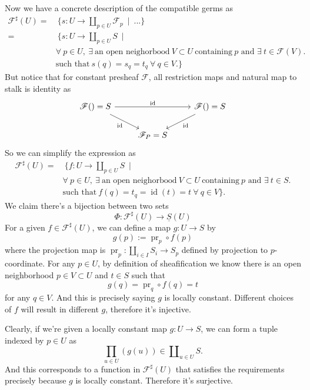 Now we have a concrete description of the compatible germs as 
\begin{align*}
    \mathscr F^{\sharp}(U)=&~\{s:U\to\amalg_{p\in U}\mathscr F_p ~\mid~ ...\}\\
    =&~\{s:U\to \amalg_{p\in U}S ~\mid~ \\
    &\forall~ p\in U,~ \exists~ \text{an open neighorbood}~ V\subset U~ \text{containing}~ p \text{ and } \exists~ t\in \mathscr F(V).\\
    &\text{such that}~ s(q)=s_q=t_q ~\forall~ q\in V.\}
\end{align*}
But notice that for constant presheaf $\mathscr F$, all restriction maps and natural map to stalk is identity as
\[\begin{tikzcd}
	{\mathscr F()=S} && {\mathscr F()=S} \\
	& {\mathscr F_P=S}
	\arrow["{\text{id}}", from=1-1, to=1-3]
	\arrow["{\text{id}}"', from=1-1, to=2-2]
	\arrow["{\text{id}}", from=1-3, to=2-2]
\end{tikzcd}\]
So we can simplify the expression as 
\begin{align*}
    \mathscr F^{\sharp}(U)=&~\{f:U\to \amalg_{p\in U}S ~\mid~ \\
    &\forall~ p\in U,~ \exists~ \text{an open neighorbood}~ V\subset U~ \text{containing}~ p \text{ and } \exists~ t\in S.\\
    &\text{such that}~ f(q)=t_q=\operatorname{id}(t)=t ~\forall~ q\in V\}.
\end{align*}
We claim there's a bijection between two sets 
\[\Phi:\mathscr F^{\sharp}(U)\to\underline{S}(U)\]
For a given $f\in\mathscr F^{\sharp}(U)$, we can define a map $g:U\to S$ by 
\[g(p):= \operatorname{pr}_{p}\circ f(p)\] where the projection map is $\operatorname{pr}_{p}:\amalg_{i\in I} S_i\to S_p$ defined by projection to $p$-coordinate. For any $p\in U$, by definition of sheafification we know there is an open neighborhood $p\in V\subset U$ and $t\in S$ such that 
\[g(q)=\operatorname{pr}_{q}\circ f(q)=t\] for any $q\in V$. And this is precisely saying $g$ is locally constant. Different choices of $f$ will result in different $g$, therefore it's injective. 

Clearly, if we're given a locally constant map $g:U\to S$, we can form a tuple indexed by $p\in U$ as
\[\prod_{u\in U} (g(u))\in \amalg_{u\in U}S.\] And this corresponds to a function in $\mathscr F^{\sharp}(U)$ that satisfies the requirements precisely because $g$ is locally constant. Therefore it's surjective.

